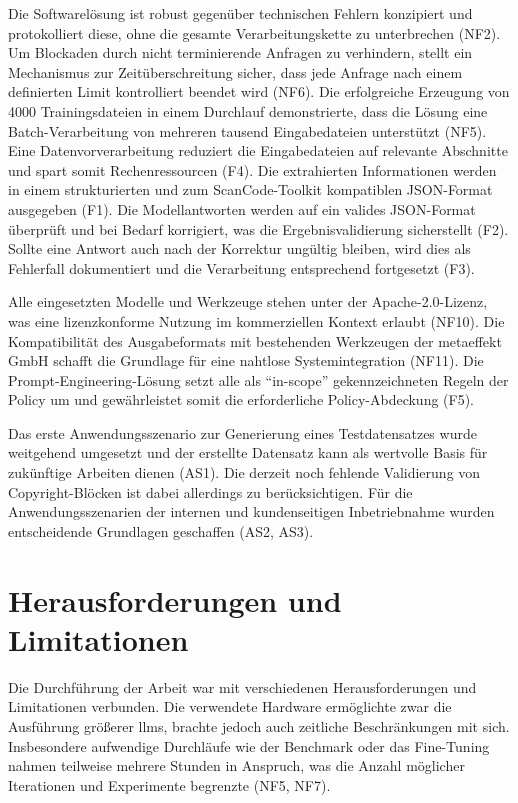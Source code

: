 Die Softwarelösung ist robust gegenüber technischen Fehlern konzipiert und protokolliert diese, ohne die gesamte Verarbeitungskette zu unterbrechen (NF2).
Um Blockaden durch nicht terminierende Anfragen zu verhindern, stellt ein Mechanismus zur Zeitüberschreitung sicher, dass jede Anfrage nach einem definierten Limit kontrolliert beendet wird (NF6).
Die erfolgreiche Erzeugung von \num{4000} Trainingsdateien in einem Durchlauf demonstrierte, dass die Lösung eine Batch-Verarbeitung von mehreren tausend Eingabedateien unterstützt (NF5).
Eine Datenvorverarbeitung reduziert die Eingabedateien auf relevante Abschnitte und spart somit Rechenressourcen (F4).
Die extrahierten Informationen werden in einem strukturierten und zum ScanCode-Toolkit kompatiblen JSON-Format ausgegeben (F1).
Die Modellantworten werden auf ein valides JSON-Format überprüft und bei Bedarf korrigiert, was die Ergebnisvalidierung sicherstellt (F2).
Sollte eine Antwort auch nach der Korrektur ungültig bleiben, wird dies als Fehlerfall dokumentiert und die Verarbeitung entsprechend fortgesetzt (F3).

Alle eingesetzten Modelle und Werkzeuge stehen unter der Apache-2.0-Lizenz, was eine lizenzkonforme Nutzung im kommerziellen Kontext erlaubt (NF10).
Die Kompatibilität des Ausgabeformats mit bestehenden Werkzeugen der metaeffekt GmbH schafft die Grundlage für eine nahtlose Systemintegration (NF11).
Die Prompt-Engineering-Lösung setzt alle als \enquote{in-scope} gekennzeichneten Regeln der Policy um und gewährleistet somit die erforderliche Policy-Abdeckung (F5).

Das erste Anwendungsszenario zur Generierung eines Testdatensatzes wurde weitgehend umgesetzt und der erstellte Datensatz kann als wertvolle Basis für zukünftige Arbeiten dienen (AS1).
Die derzeit noch fehlende Validierung von Copyright-Blöcken ist dabei allerdings zu berücksichtigen.
Für die Anwendungsszenarien der internen und kundenseitigen Inbetriebnahme wurden entscheidende Grundlagen geschaffen (AS2, AS3).


\section{Herausforderungen und Limitationen}

Die Durchführung der Arbeit war mit verschiedenen Herausforderungen und Limitationen verbunden.
Die verwendete Hardware ermöglichte zwar die Ausführung größerer \glspl{llm}, brachte jedoch auch zeitliche Beschränkungen mit sich.
Insbesondere aufwendige Durchläufe wie der Benchmark oder das Fine-Tuning nahmen teilweise mehrere Stunden in Anspruch, was die Anzahl möglicher Iterationen und Experimente begrenzte (NF5, NF7).

